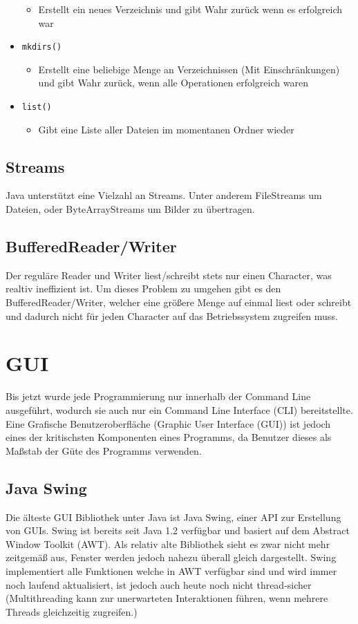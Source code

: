 \documentclass{article}
\begin{document}
\begin{itemize}
		\begin{itemize}
			\item{Erstellt ein neues Verzeichnis und gibt Wahr zurück wenn es erfolgreich war}
		\end{itemize}
		\item{\texttt{mkdirs()}}
		\begin{itemize}
			\item{Erstellt eine beliebige Menge an Verzeichnissen (Mit Einschränkungen) und gibt Wahr zurück, wenn alle Operationen erfolgreich waren}
		\end{itemize}
		\item{\texttt{list()}}
		\begin{itemize}
			\item{Gibt eine Liste aller Dateien im momentanen Ordner wieder}
		\end{itemize}
	\end{itemize}
	\subsection{Streams}
	Java unterstützt eine Vielzahl an Streams. Unter anderem FileStreams um Dateien, oder ByteArrayStreams um Bilder zu übertragen.
	\subsection{BufferedReader/Writer}
	Der reguläre Reader und Writer liest/schreibt stets nur einen Character, was realtiv ineffizient ist. Um dieses Problem zu umgehen gibt es den BufferedReader/Writer, welcher eine größere Menge auf einmal liest oder schreibt und dadurch nicht für jeden Character auf das Betriebssystem zugreifen muss.
	\section{GUI}
	Bis jetzt wurde jede Programmierung nur innerhalb der Command Line ausgeführt, wodurch sie auch nur ein Command Line Interface (CLI) bereitstellte. Eine Grafische Benutzeroberfläche (Graphic User Interface (GUI)) ist jedoch eines der kritischsten Komponenten eines Programms, da Benutzer dieses als Maßstab der Güte des Programms verwenden. 
	\subsection{Java Swing}
	Die älteste GUI Bibliothek unter Java ist Java Swing, einer API zur Erstellung von GUIs. Swing ist bereits seit Java 1.2 verfügbar und basiert auf dem Abstract Window Toolkit (AWT). Als relativ alte Bibliothek sieht es zwar nicht mehr zeitgemäß aus, Fenster werden jedoch nahezu überall gleich dargestellt. Swing implementiert alle Funktionen welche in AWT verfügbar sind und wird immer noch laufend aktualisiert, ist jedoch auch heute noch nicht thread-sicher (Multithreading kann zur unerwarteten Interaktionen führen, wenn mehrere Threads gleichzeitig zugreifen.) \\
\end{document}
